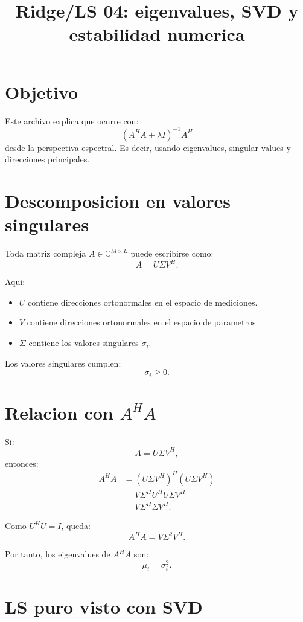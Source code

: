 \documentclass[11pt]{article}
\title{Ridge/LS 04: eigenvalues, SVD y estabilidad numerica}
\author{}
\date{}
\begin{document}
\maketitle

\section{Objetivo}

Este archivo explica que ocurre con:
\[
    (A^H A + \lambda I)^{-1}A^H
\]
desde la perspectiva espectral. Es decir, usando eigenvalues, singular values y
direcciones principales.

\section{Descomposicion en valores singulares}

Toda matriz compleja \(A\in\mathbb{C}^{M\times L}\) puede escribirse como:
\[
    A = U\Sigma V^H.
\]

Aqui:

\begin{itemize}
    \item \(U\) contiene direcciones ortonormales en el espacio de mediciones.
    \item \(V\) contiene direcciones ortonormales en el espacio de parametros.
    \item \(\Sigma\) contiene los valores singulares \(\sigma_i\).
\end{itemize}

Los valores singulares cumplen:
\[
    \sigma_i \ge 0.
\]

\section{Relacion con \(A^H A\)}

Si:
\[
    A = U\Sigma V^H,
\]
entonces:
\[
\begin{aligned}
    A^H A
    &=
    (U\Sigma V^H)^H(U\Sigma V^H)\\
    &=
    V\Sigma^H U^H U\Sigma V^H\\
    &=
    V\Sigma^H\Sigma V^H.
\end{aligned}
\]

Como \(U^H U = I\), queda:
\[
    A^H A = V\Sigma^2 V^H.
\]

Por tanto, los eigenvalues de \(A^H A\) son:
\[
    \mu_i = \sigma_i^2.
\]

\section{LS puro visto con SVD}
\end{document}
